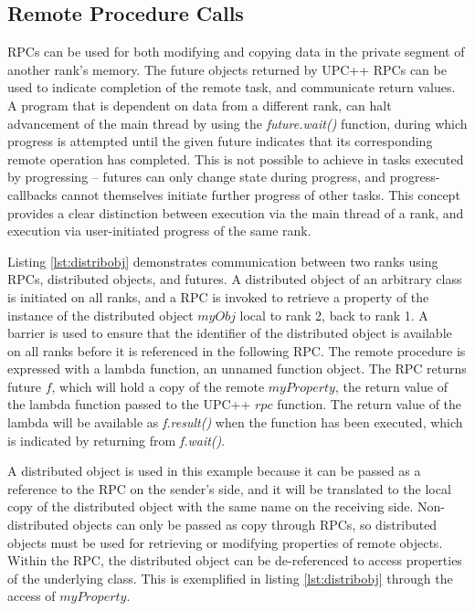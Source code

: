 \documentclass{uit-report}
\begin{document}
\subsection{Remote Procedure Calls}

RPCs can be used for both modifying and copying data in the private segment of another rank's memory. The future objects returned by UPC++ RPCs can be used to indicate completion of the remote task, and communicate return values. A program that is dependent on data from a different rank, can halt advancement of the main thread by using the \emph{future.wait()} function, during which progress is attempted until the given future indicates that its corresponding remote operation has completed. This is not possible to achieve in tasks executed by progressing -- futures can only change state during progress, and progress-callbacks cannot themselves initiate further progress of other tasks. This concept provides a clear distinction between execution via the main thread of a rank, and execution via user-initiated progress of the same rank.

Listing \ref{lst:distribobj} demonstrates communication between two ranks using RPCs, distributed objects, and futures. A distributed object of an arbitrary class is initiated on all ranks, and a RPC is invoked to retrieve a property of the instance of the distributed object $myObj$ local to rank 2, back to rank 1. A barrier is used to ensure that the identifier of the distributed object is available on all ranks before it is referenced in the following RPC. The remote procedure is expressed with a lambda function, an unnamed function object. The RPC returns future $f$, which will hold a copy of the remote $myProperty$, the return value of the lambda function passed to the UPC++ $rpc$ function. The return value of the lambda will be available as \emph{f.result()} when the function has been executed, which is indicated by returning from \emph{f.wait()}. 

A distributed object is used in this example because it can be passed as a reference to the RPC on the sender's side, and it will be translated to the local copy of the distributed object with the same name on the receiving side. Non-distributed objects can only be passed as copy through RPCs, so distributed objects must be used for retrieving or modifying properties of remote objects. Within the RPC, the distributed object can be de-referenced to access properties of the underlying class. This is exemplified in listing \ref{lst:distribobj} through the access of $myProperty$.
\end{document}
